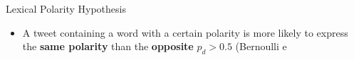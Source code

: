 \documentclass[handout]{beamer}
\begin{document}
\begin{frame}{Lexical Polarity Hypothesis}
\begin{scriptsize}
\begin{itemize}

\item A tweet containing a word with a certain polarity is more likely to express the \textbf{same polarity} than the \textbf{opposite} $p_d>0.5$ (Bernoulli e
\end{itemize}
\end{scriptsize}
\end{frame}
\end{document}
